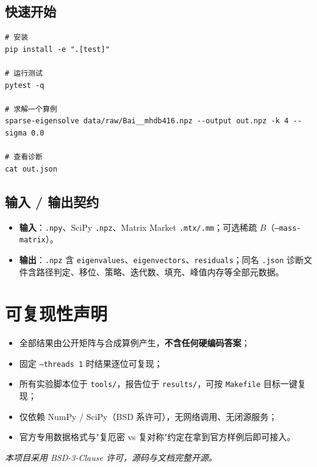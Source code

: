 \documentclass[11pt,a4paper]{ctexart}
\newcommand{\code}[1]{\texttt{\small #1}}
\begin{document}
\subsection{快速开始}

\begin{lstlisting}
# 安装
pip install -e ".[test]"

# 运行测试
pytest -q

# 求解一个算例
sparse-eigensolve data/raw/Bai__mhdb416.npz --output out.npz -k 4 --sigma 0.0

# 查看诊断
cat out.json
\end{lstlisting}

\subsection{输入 / 输出契约}

\begin{itemize}
  \item \textbf{输入}：\code{.npy}、SciPy \code{.npz}、Matrix Market \code{.mtx/.mm}；可选稀疏 $B$（\code{--mass-matrix}）。
  \item \textbf{输出}：\code{.npz} 含 \code{eigenvalues}、\code{eigenvectors}、\code{residuals}；同名 \code{.json} 诊断文件含路径判定、移位、策略、迭代数、填充、峰值内存等全部元数据。
\end{itemize}

\section{可复现性声明}

\begin{itemize}
  \item 全部结果由公开矩阵与合成算例产生，\textbf{不含任何硬编码答案}；
  \item 固定 \code{--threads 1} 时结果逐位可复现；
  \item 所有实验脚本位于 \code{tools/}，报告位于 \code{results/}，可按 \code{Makefile} 目标一键复现；
  \item 仅依赖 NumPy / SciPy（BSD 系许可），无网络调用、无闭源服务；
  \item 官方专用数据格式与"复厄密 vs 复对称"约定在拿到官方样例后即可接入。
\end{itemize}

\vspace{1.0cm}
\begin{center}
\small\itshape
本项目采用 BSD-3-Clause 许可，源码与文档完整开源。
\end{center}
\end{document}
